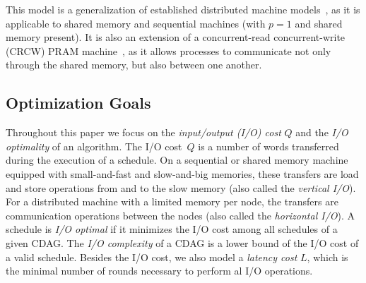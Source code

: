 \documentclass[sigplan,review,anonymous,10pt]{acmart}\settopmatter{printfolios=true,printccs=false,printacmref=false}
\newcommand\greg[1]{\textcolor{blue}{[Greg: #1]}}
\newcommand\mac[1]{\textcolor{red}{[Mac: #1]}}
\begin{document}
This model is a generalization of established distributed machine 
models~\cite{CARMA,25d}, as it is applicable to shared memory and sequential 
machines (with $p=1$ and shared memory present). It is also an extension of a 
concurrent-read concurrent-write (CRCW) PRAM machine~\cite{pram}, as it allows 
processes to communicate not only through the shared memory, but also between 
one another.

%


\subsection{Optimization Goals}
\label{sec:optGoals}
%
Throughout this paper we focus on the \emph{input/output (I/O) cost} $Q$ and 
the \emph{I/O optimality} of an algorithm.
%
The 
I/O cost~$Q$ is a number of words transferred during the execution 
of a schedule. On a sequential or shared memory machine equipped 
with small-and-fast and slow-and-big memories, these transfers are load 
and store operations from and to the slow memory (also called the 
\emph{vertical 
	I/O}). For a distributed machine with a limited memory per node, 
the 
transfers are communication operations between the nodes (also called the
\emph{horizontal I/O}). A schedule is \emph{I/O optimal} if it minimizes the 
I/O cost among all schedules of a given CDAG. 
The 
\emph{I/O complexity} of a 
CDAG is a lower bound of the I/O cost of a valid schedule.
%
Besides the I/O cost, we also model a \emph{latency cost} $L$, which is the 
minimal number of rounds necessary to perform al I/O operations.

\end{document}
